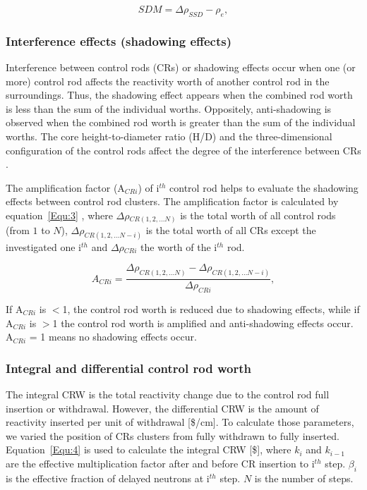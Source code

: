\begin{equation}
\label{Equ:6}
{SDM}={{\Delta}{\rho}_{SSD}}-{{\rho}_{e}},
\end{equation}

\subsubsection{Interference effects (shadowing effects)}

Interference between control rods (CRs) or shadowing effects occur when one 
(or more) control rod affects the reactivity worth of another control rod in 
the surroundings. Thus, the shadowing effect appears when the combined rod worth
is less than the sum of the individual worths. Oppositely, anti-shadowing is observed 
when the combined rod worth is greater than the sum of the individual worths.
The core height-to-diameter ratio (H/D) and the three-dimensional configuration 
of the control rods affect the degree of the interference between CRs \cite{girardin2007control}. 

The amplification factor (A$_{CRi}$) of i$^{th}$ control rod helps to evaluate the shadowing effects between control rod clusters. The amplification factor is calculated by equation~\ref{Equ:3} \cite{girardin2007control,vcerba2017optimization}, where $\Delta\rho$$_{CR(1,2,\ldots N)}$ is the total worth of all control rods (from $1$ to $N$), $\Delta\rho$$_{CR(1,2,\ldots N-i)}$ is the total worth of all CRs except the investigated one i$^{th}$ and $\Delta\rho$$_{CRi}$ the worth of the i$^{th}$ rod.

\begin{equation}
\label{Equ:3}
{{A}_{CRi}}=\dfrac{{{\Delta}{\rho}_{CR(1,2,\ldots N)}}-{{\Delta}{\rho}_{CR(1,2,\ldots N-i)}}}{{\Delta}{\rho}_{CRi}},
\end{equation}

If A$_{CRi}$ is $<$1, the control rod worth is reduced due to shadowing effects, while if A$_{CRi}$ is $>$1 the control rod worth is amplified and anti-shadowing effects occur. A$_{CRi}$ = 1 means no shadowing effects occur.

\subsubsection{Integral and differential control rod worth}

The integral CRW is the total reactivity change due to the control rod full 
insertion or withdrawal. However, the differential CRW is the amount of 
reactivity inserted per unit of withdrawal [\$/cm]. To calculate those 
parameters, we varied the position of CRs clusters from fully withdrawn to 
fully inserted. Equation~\ref{Equ:4} is used to calculate the integral CRW 
[\$], where $k_{i}$ and $k_{i-1}$ are the effective multiplication factor 
after and before CR insertion to i$^{th}$ step. $\beta_{i}$ is the effective 
fraction of delayed neutrons at i$^{th}$ step. $N$ is the number of steps.

